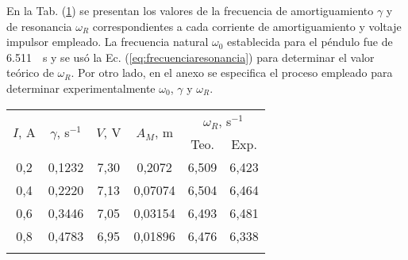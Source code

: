 En la Tab. (\ref{tab:gammas}) se presentan los valores de la frecuencia de amortiguamiento $\gamma$ y de resonancia $\omega_R$ correspondientes a cada corriente de amortiguamiento y
voltaje impulsor empleado. La frecuencia natural $\omega_0$ establecida para el péndulo fue
de \qty{6,511}{\per\second} y se usó la Ec. (\ref{eq:frecuenciaresonancia}) para determinar el
valor teórico de $\omega_R$. Por otro lado, en el anexo se especifica el proceso empleado
para determinar experimentalmente $\omega_0$, $\gamma$ y $\omega_R$. 

\begin{table}[H]
	\centering
	\begin{tabular}{c c c c c c}
		\toprule
		 \multirow{2}{*}{$I$, A} & \multirow{2}{*}{$\gamma$, s$^{-1}$} & \multirow{2}{*}{$V$, V} & \multirow{2}{*}{$A_M$, m} & \multicolumn{2}{c}{$\omega_R$, s$^{-1}$} \\
		\cmidrule(l){5-6}
		& & & & Teo. & Exp. \\
		\cmidrule(r){1-2} \cmidrule(l){3-6}
		0,2 & 0,1232 & 7,30 & 0,2072  & 6,509 & 6,423 \\
		0,4 & 0,2220 & 7,13 & 0,07074 & 6,504 & 6,464 \\
		0,6 & 0,3446 & 7,05 & 0,03154 & 6,493 & 6,481 \\
		0,8 & 0,4783 & 6,95 & 0,01896 & 6,476 & 6,338 \\
		\bottomrule
		\label{tab:gammas}
	\end{tabular}
\end{table}